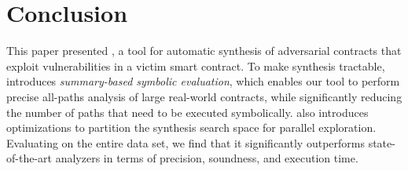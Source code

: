\section{Conclusion}\label{sec:concl}
This paper presented \toolname, a tool for automatic synthesis of adversarial
contracts that exploit vulnerabilities in a victim smart contract. To make
synthesis tractable, \toolname introduces \emph{summary-based symbolic
evaluation}, which enables our tool to perform precise all-paths analysis of
large real-world contracts, while significantly reducing the number of paths
that need to be executed symbolically. \toolname also introduces optimizations
to partition the synthesis search space for parallel exploration. %
Evaluating \toolname on the entire
\etherscan data set, we find that it significantly outperforms  state-of-the-art
analyzers in terms of precision, soundness, and execution time.

